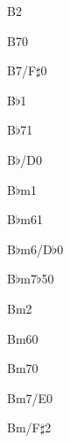 \begin{chordbox}{B}{2}
\end{chordbox}\cspace
%
\begin{chordbox}{B7}{0}
\end{chordbox}\cspace
%
\begin{chordbox}{B7/F$\sharp$}{0}
\end{chordbox}\cspace
%
\begin{chordbox}{B$\flat$}{1}
\end{chordbox}\cspace
%
\begin{chordbox}{B$\flat$7}{1}
\end{chordbox}\cspace
%
\begin{chordbox}{B$\flat$/D}{0}
\end{chordbox}\cspace
%
\begin{chordbox}{B$\flat$m}{1}
\end{chordbox}\cspace
%
\begin{chordbox}{B$\flat$m6}{1}
\end{chordbox}\cspace
%
\begin{chordbox}{B$\flat$m6/D$\flat$}{0}
\end{chordbox}\cspace
%
\begin{chordbox}{B$\flat$m7$\flat$5}{0}
\end{chordbox}\cspace
%
\begin{chordbox}{Bm}{2}
\end{chordbox}\cspace
%
\begin{chordbox}{Bm6}{0}
\end{chordbox}\cspace
%
\begin{chordbox}{Bm7}{0}
\end{chordbox}\cspace
%
\begin{chordbox}{Bm7/E}{0}
\end{chordbox}\cspace
%
\begin{chordbox}{Bm/F$\sharp$}{2}
\end{chordbox}\cspace

